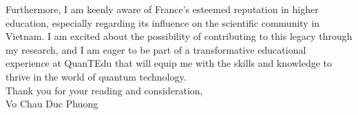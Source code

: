 \documentclass[a4paper]{article}
\begin{document}
	\quad Furthermore, I am keenly aware of France's esteemed reputation in higher education, especially regarding its influence on the scientific community in Vietnam. I am excited about the possibility of contributing to this legacy through my research, and I am eager to be part of a transformative educational experience at QuanTEdu that will equip me with the skills and knowledge to thrive in the world of quantum technology.\vspace{1cm}\\\null\quad
	Thank you for your reading and consideration,\\
	
	Vo Chau Duc Phuong
\end{document}
